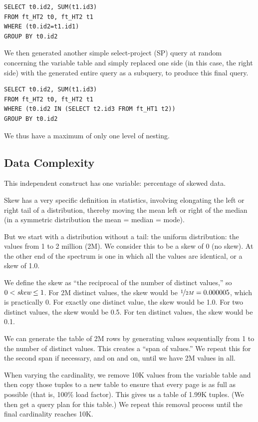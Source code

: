 \documentclass[prodmode,acmtods]{acmsmall}
\begin{document}
\begin{verbatim}
SELECT t0.id2, SUM(t1.id3)
FROM ft_HT2 t0, ft_HT2 t1
WHERE (t0.id2=t1.id1)
GROUP BY t0.id2
\end{verbatim}

We then generated another simple select-project (SP) 
query at random concerning the variable table 
and simply replaced one side (in this case, the right side) with the generated entire 
query as a subquery, to produce this final query.

\begin{verbatim}
SELECT t0.id2, SUM(t1.id3)
FROM ft_HT2 t0, ft_HT2 t1
WHERE (t0.id2 IN (SELECT t2.id3 FROM ft_HT1 t2)) 
GROUP BY t0.id2
\end{verbatim}
We thus have a maximum of only one level of nesting.

\subsection{Data Complexity}\label{sec:datacomplexity}
This independent construct has one variable: percentage of skewed data.

Skew has a very specific definition in statistics, 
involving elongating the left or right tail of a distribution, 
thereby moving the mean left or right of the median 
(in a symmetric distribution the mean = median = mode).

But we start with a distribution without a tail: 
the uniform distribution: the values from 1 to 2 million (2M). 
We consider this to be a skew of 0 (no skew). 
At the other end of the spectrum is one in which all the values are identical, 
or a skew of 1.0.

We define the skew as ``the reciprocal of the number of distinct
values,'' so $0 < \hbox{\em skew} \leq 1$.
For 2M distinct values, the skew would be $\nicefrac{1}{2M}= 0.000005$, which is practically 0. 
For exactly one distinct value, the skew would be 1.0. For two distinct values, 
the skew would be 0.5. For ten distinct values, the skew would be 0.1.

We can generate the table of 2M rows by generating values sequentially from
1 to the number of distinct values.  This creates a ``span of values.'' We
repeat this for the second span if necessary, and on and on, until we have
2M values in all.

When varying the cardinality, we remove 10K values from the variable table
and then copy those tuples to a new table to ensure that every page is as
full as possible (that is, 100\% load factor).  This gives us a table of
1.99K tuples. (We then get a query plan for this table.)  We repeat this
removal process until the final cardinality reaches 10K.
\end{document}
